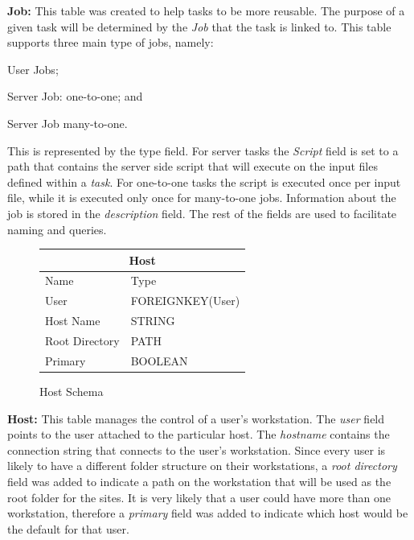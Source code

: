 \documentclass[12pt,a4paper]{report}
\begin{document}
\noindent\textbf{Job:} This table was created to help tasks to be more reusable.
The purpose of a given task will be determined by the \emph{Job} that the task
is linked to. This table supports three main type of jobs, namely:
\begin{inparaenum}[(i)] \item User Jobs; \item Server Job: one-to-one; and \item
Server Job many-to-one.\end{inparaenum} This is represented by the type field.
For server tasks the \emph{Script} field is set to a path that contains the
server side script that will execute on the input files defined within a \emph{task}.
For one-to-one tasks  the script is executed once per input file, while it
is executed only once for many-to-one jobs. Information about the job is stored
in the \emph{description} field. The rest of the fields are used to facilitate
naming and queries.
\\
\begin{figure}
\begin{tabular}{l|l}
    \multicolumn{2}{c}{Host} \\
    \hline
    Name        & Type \\
    \hline
    User        & FOREIGNKEY(User)  \\
    Host Name   & STRING  \\
    Root Directory & PATH \\
    Primary      & BOOLEAN \\
\end{tabular}
\caption{Host Schema}
\end{figure}

\noindent\textbf{Host:} This table manages the control of a user's workstation.
The \emph{user} field points to the user attached to the particular host. The
\emph{hostname} contains the connection string that connects to the user's workstation.
Since every user is likely to have a different folder structure on their workstations,
a \emph{root directory} field was added to indicate a path on the workstation that
will be used as the root folder for the sites. It is very likely that a user could
have more than one workstation, therefore a \emph{primary} field was added to indicate
which host would be the default for that user.
\\
\end{document}
